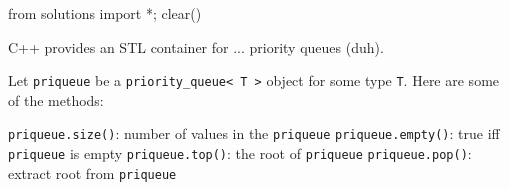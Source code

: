 \begin{python0}
from solutions import *; clear()
\end{python0}

C++ provides an STL container 
for ...
priority queues (duh).

Let \verb!priqueue! be a \verb!priority_queue< T >! object
for some type \verb!T!.
Here are some of the methods:
\begin{enumerate}[nosep]
  \li \texttt{priqueue.size()}: number of values in the \verb!priqueue! 
  \li \texttt{priqueue.empty()}: true iff \verb!priqueue! is empty
  \li \texttt{priqueue.top()}: the root of \verb!priqueue!
  \li \texttt{priqueue.pop()}: extract root from \verb!priqueue!
\end{enumerate}


